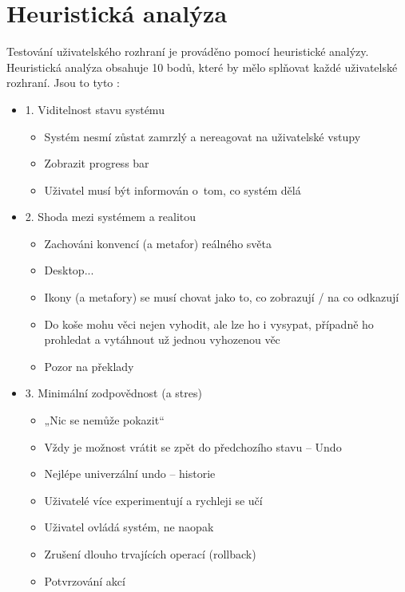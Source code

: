 \section{Heuristická analýza}

\label{nur:test}

Testování uživatelského rozhraní je prováděno pomocí heuristické analýzy. Heuristická analýza obsahuje 10 bodů, které by mělo splňovat každé uživatelské rozhraní. Jsou to tyto \cite{nur-heu}:

\begin{itemize}
    \item 1. Viditelnost stavu systému
        \begin{itemize}
            \item Systém nesmí zůstat zamrzlý a nereagovat na uživatelské vstupy
            \item Zobrazit progress bar
            \item Uživatel musí být informován o~tom, co systém dělá
        \end{itemize}
    \item 2. Shoda mezi systémem a realitou
        \begin{itemize}
            \item Zachováni konvencí (a metafor) reálného světa
            \item Desktop...
            \item Ikony (a metafory) se musí chovat jako to, co zobrazují / na co odkazují
            \item Do koše mohu věci nejen vyhodit, ale lze ho i vysypat, případně ho prohledat a vytáhnout už jednou vyhozenou věc
            \item Pozor na překlady
        \end{itemize}
    \item 3. Minimální zodpovědnost (a stres)
        \begin{itemize}
            \item „Nic se nemůže pokazit“
            \item Vždy je možnost vrátit se zpět do předchozího stavu – Undo
            \item Nejlépe univerzální undo – historie
            \item Uživatelé více experimentují a rychleji se učí
            \item Uživatel ovládá systém, ne naopak
            \item Zrušení dlouho trvajících operací (rollback)
            \item Potvrzování akcí

\end{itemize}
\end{itemize}
